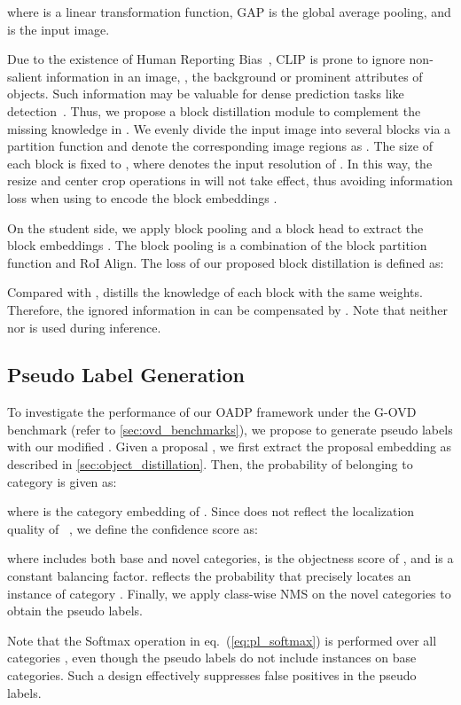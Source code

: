 \documentclass[10pt,twocolumn,letterpaper]{article}
\begin{document}
where  is a linear transformation function, GAP is the global average pooling, and  is the input image.

Due to the existence of Human Reporting Bias~\cite{human_reporting_bias}, CLIP is prone to ignore non-salient information in an image, \eg, the background or prominent attributes of objects.
Such information may be valuable for dense prediction tasks like detection~\cite{defeat}.
Thus, we propose a block distillation module  to complement the missing knowledge in .
We evenly divide the input image into several blocks  via a partition function  and denote the corresponding image regions as .
The size of each block is fixed to , where  denotes the input resolution of .
In this way, the resize and center crop operations in  will not take effect, thus avoiding information loss when using  to encode the block embeddings .

On the student side, we apply block pooling and a block head to extract the block embeddings .
The block pooling is a combination of the block partition function  and RoI Align.
The loss of our proposed block distillation is defined as:

Compared with ,  distills the knowledge of each block with the same weights.
Therefore, the ignored information in  can be compensated by .
Note that neither  nor  is used during inference.
 
\subsection{Pseudo Label Generation}
\label{sec:pseudo_label_generation}

To investigate the performance of our OADP framework under the G-OVD benchmark (refer to \cref{sec:ovd_benchmarks}), we propose to generate pseudo labels with our modified .
Given a proposal , we first extract the proposal embedding  as described in \cref{sec:object_distillation}.
Then, the probability of  belonging to category  is given as:

where  is the category embedding of .
Since  does not reflect the localization quality of ~\cite{vild}, we define the confidence score  as:

where  includes both base and novel categories,  is the objectness score of , and  is a constant balancing factor.
 reflects the probability that  precisely locates an instance of category .
Finally, we apply class-wise NMS on the novel categories to obtain the pseudo labels.

Note that the Softmax operation in eq.~(\ref{eq:pl_softmax}) is performed over all categories , even though the pseudo labels do not include instances on base categories.
Such a design effectively suppresses false positives in the pseudo labels.
\end{document}
